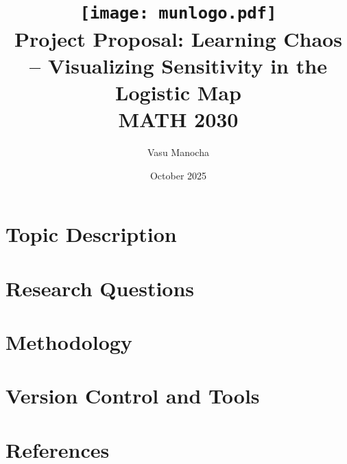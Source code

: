 \documentclass[12pt]{article}
\title{
    \texttt{[image: munlogo.pdf]}\\[1em]
    \textbf{Project Proposal: Learning Chaos – Visualizing Sensitivity in the Logistic Map}\\
    \vspace{0.5em}
    \large MATH 2030 
}
\author{Vasu Manocha}
\date{October 2025}
\begin{document}
\maketitle

\section{Topic Description}

\section{Research Questions}

\section{Methodology}

\section{Version Control and Tools}

\section{References}
\end{document}
